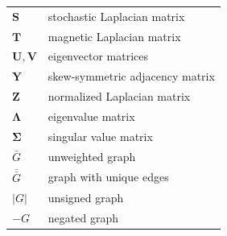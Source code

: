 \documentclass{article}
\begin{document}
\begin{longtable}{ll}
  $\mathbf S$ & stochastic Laplacian matrix \\
  $\mathbf T$ & magnetic Laplacian matrix \\
  $\mathbf U, \mathbf V$ & eigenvector matrices \\
  $\mathbf Y$ & skew-symmetric adjacency matrix \\
  $\mathbf Z$ & normalized Laplacian matrix \\
\midrule
  $\mathbf \Lambda$ & eigenvalue matrix \\
  $\mathbf \Sigma$ & singular value matrix \\
\midrule
  $\bar G$ & unweighted graph \\
  $\bar{\bar G}$ & graph with unique edges \\
  $|G|$ & unsigned graph \\ 
  $-G$  & negated graph 
\end{longtable}
\end{document}
